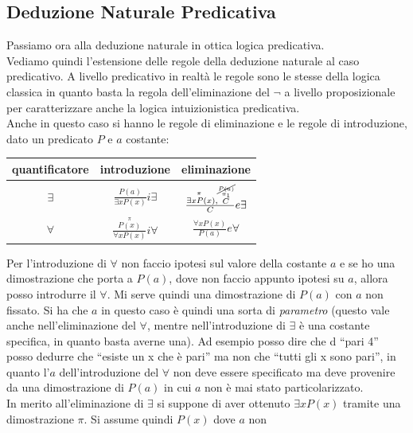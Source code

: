 \documentclass[a4paper,12pt, oneside]{book}
\begin{document}
\subsection{Deduzione Naturale Predicativa}
Passiamo ora alla deduzione naturale in ottica logica predicativa.\\
Vediamo quindi l'estensione delle regole della deduzione naturale al caso
predicativo. A livello predicativo in realtà le regole sono le stesse della
logica classica in quanto basta la regola dell'eliminazione del $\neg$ a livello
proposizionale per caratterizzare anche la logica intuizionistica predicativa.\\
Anche in questo caso si hanno le regole di eliminazione e le regole di
introduzione, dato un predicato $P$ e $a$ costante:
\begin{table}[H]
  \Large
  \centering
  \begin{tabular}{c|c|c}
    quantificatore & introduzione & eliminazione\\
    \hline
    $\exists$ & $\frac{P(a)}{\exists xP(x)}i\exists$
                                  &$\frac{\stackrel{\pi}{\exists xP(x}),
                                    \stackrel{
                                    \stackrel{\cancel{P(a)}}{\pi_1}}{C}}{C}
                                    e\exists$\\
    \hline
    $\forall$ & $\frac{\stackrel{\pi}{P(x)}}{\forall xP(x)}i\forall$
                                  &$\frac{\forall xP(x)}{P(a)}e\forall$\\
  \end{tabular}
\end{table}
Per l'introduzione di $\forall$ non faccio ipotesi sul valore della costante $a$
e se ho una dimostrazione che porta a $P(a)$, dove non faccio appunto ipotesi su
$a$, allora posso introdurre il $\forall$. Mi serve quindi una dimostrazione di
$P(a)$ con $a$ non fissato. Si ha che $a$ in questo caso è quindi una sorta di
\textit{parametro} (questo vale anche nell'eliminazione del $\forall$, mentre
nell'introduzione di $\exists$ è una costante specifica, in quanto basta averne
una). Ad esempio posso dire che d ``pari 4'' posso dedurre che ``esiste un x
che è pari'' ma non che ``tutti gli x sono pari'', in quanto l'$a$
dell'introduzione del $\forall$ non deve essere specificato ma deve provenire da
una dimostrazione di $P(a)$ in cui $a $ non è mai stato particolarizzato.\\  
In merito all'eliminazione di $\exists$ si suppone di aver ottenuto $\exists
xP(x)$ tramite una dimostrazione $\pi$. Si assume quindi $P(x)$ dove $a$ non
\end{document}
